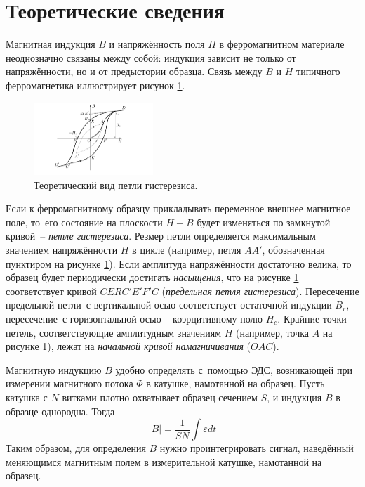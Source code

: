 \documentclass[a4paper]{article}
\begin{document}
\section{Теоретические сведения}

Магнитная индукция $B$ и напряжённость поля $H$ в ферромагнитном материале неоднозначно связаны между собой: индукция зависит не только от напряжённости, но и от предыстории образца. Связь между $B$ и $H$ типичного ферромагнетика иллюстрирует рисунок \ref{Theor}.

\begin{figure}\vspace{-6mm}
  \centering
  \includegraphics[width=4.5cm]{pick1.PNG}
  \caption{Теоретический вид петли гистерезиса.}
  \label{Theor}
\end{figure}

Если к ферромагнитному образцу прикладывать переменное внешнее магнитное поле, то~его состояние на плоскости $H-B$ будет изменяться по замкнутой кривой~-- \textit{петле гистерезиса}.
Резмер петли определяется максимальным значением напряжённости $H$ в цикле (например, петля $AA'$, обозначенная пунктиром на рисунке \ref{Theor}).
Если амплитуда напряжённости достаточно велика, то образец будет периодически достигать \textit{насыщения},
что на рисунке \ref{Theor} соответствует кривой $CERC'E'F'C$ (\textit{предельная петля гистерезиса}).
Пересечение предельной петли~с вертикальной осью соответствует остаточной индукции $B_r$, пересечение~с горизонтальной осью -- коэрцитивному полю $H_c$.
Крайние точки петель, соответствующие амплитудным значениям $H$ (например, точка $A$ на рисунке \ref{Theor}), лежат на \textit{начальной кривой намагничивания} ($OAC$).
\newpage

Магнитную индукцию $B$ удобно определять с~помощью ЭДС, возникающей при измерении магнитного потока $\Phi$ в катушке, намотанной на образец. Пусть катушка с $N$ витками плотно охватывает образец сечением $S$, и индукция $B$ в образце однородна. Тогда
\[\left\lvert B \right\rvert =\frac{1}{SN} \int \varepsilon  dt \]
Таким образом, для определения $B$ нужно проинтегрировать сигнал, наведённый меняющимся магнитным полем в измерительной катушке, намотанной на образец.
\end{document}
